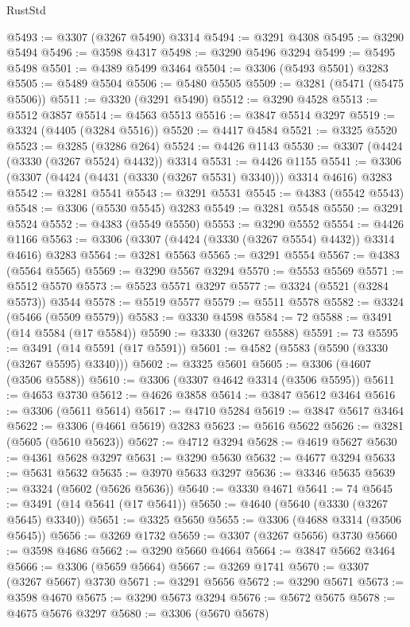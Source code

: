 \begin{lexlean}{RustStd}
\begin{coremodule}
@5493 := @3307 (@3267 @5490) @3314
@5494 := @3291 @4308
@5495 := @3290 @5494
@5496 := @3598 @4317
@5498 := @3290 @5496 @3294
@5499 := @5495 @5498
@5501 := @4389 @5499 @3464
@5504 := @3306 (@5493 @5501) @3283
@5505 := @5489 @5504
@5506 := @5480 @5505
@5509 := @3281 (@5471 (@5475 @5506))
@5511 := @3320 (@3291 @5490)
@5512 := @3290 @4528
@5513 := @5512 @3857
@5514 := @4563 @5513
@5516 := @3847 @5514 @3297
@5519 := @3324 (@4405 (@3284 @5516))
@5520 := @4417 @4584
@5521 := @3325 @5520
@5523 := @3285 (@3286 @264)
@5524 := @4426 @1143
@5530 := @3307 (@4424 (@3330 (@3267 @5524) @4432)) @3314
@5531 := @4426 @1155
@5541 := @3306 (@3307 (@4424 (@4431 (@3330 (@3267 @5531) @3340))) @3314 @4616) @3283
@5542 := @3281 @5541
@5543 := @3291 @5531
@5545 := @4383 (@5542 @5543)
@5548 := @3306 (@5530 @5545) @3283
@5549 := @3281 @5548
@5550 := @3291 @5524
@5552 := @4383 (@5549 @5550)
@5553 := @3290 @5552
@5554 := @4426 @1166
@5563 := @3306 (@3307 (@4424 (@3330 (@3267 @5554) @4432)) @3314 @4616) @3283
@5564 := @3281 @5563
@5565 := @3291 @5554
@5567 := @4383 (@5564 @5565)
@5569 := @3290 @5567 @3294
@5570 := @5553 @5569
@5571 := @5512 @5570
@5573 := @5523 @5571 @3297
@5577 := @3324 (@5521 (@3284 @5573)) @3544
@5578 := @5519 @5577
@5579 := @5511 @5578
@5582 := @3324 (@5466 (@5509 @5579))
@5583 := @3330 @4598
@5584 := 72
@5588 := @3491 (@14 @5584 (@17 @5584))
@5590 := @3330 (@3267 @5588)
@5591 := 73
@5595 := @3491 (@14 @5591 (@17 @5591))
@5601 := @4582 (@5583 (@5590 (@3330 (@3267 @5595) @3340)))
@5602 := @3325 @5601
@5605 := @3306 (@4607 (@3506 @5588))
@5610 := @3306 (@3307 @4642 @3314 (@3506 @5595))
@5611 := @4653 @3730
@5612 := @4626 @3858
@5614 := @3847 @5612 @3464
@5616 := @3306 (@5611 @5614)
@5617 := @4710 @5284
@5619 := @3847 @5617 @3464
@5622 := @3306 (@4661 @5619) @3283
@5623 := @5616 @5622
@5626 := @3281 (@5605 (@5610 @5623))
@5627 := @4712 @3294
@5628 := @4619 @5627
@5630 := @4361 @5628 @3297
@5631 := @3290 @5630
@5632 := @4677 @3294
@5633 := @5631 @5632
@5635 := @3970 @5633 @3297
@5636 := @3346 @5635
@5639 := @3324 (@5602 (@5626 @5636))
@5640 := @3330 @4671
@5641 := 74
@5645 := @3491 (@14 @5641 (@17 @5641))
@5650 := @4640 (@5640 (@3330 (@3267 @5645) @3340))
@5651 := @3325 @5650
@5655 := @3306 (@4688 @3314 (@3506 @5645))
@5656 := @3269 @1732
@5659 := @3307 (@3267 @5656) @3730
@5660 := @3598 @4686
@5662 := @3290 @5660 @4664
@5664 := @3847 @5662 @3464
@5666 := @3306 (@5659 @5664)
@5667 := @3269 @1741
@5670 := @3307 (@3267 @5667) @3730
@5671 := @3291 @5656
@5672 := @3290 @5671
@5673 := @3598 @4670
@5675 := @3290 @5673 @3294
@5676 := @5672 @5675
@5678 := @4675 @5676 @3297
@5680 := @3306 (@5670 @5678)

\end{coremodule}
\end{lexlean}

